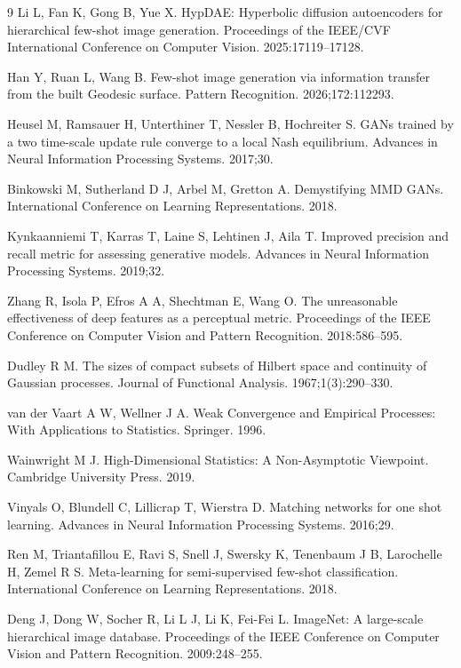\documentclass{article}
\begin{document}
\begin{thebibliography}{9}
Li L, Fan K, Gong B, Yue X. HypDAE: Hyperbolic diffusion autoencoders for hierarchical few-shot image generation. Proceedings of the IEEE/CVF International Conference on Computer Vision. 2025:17119--17128.

Han Y, Ruan L, Wang B. Few-shot image generation via information transfer from the built Geodesic surface. Pattern Recognition. 2026;172:112293.

Heusel M, Ramsauer H, Unterthiner T, Nessler B, Hochreiter S. GANs trained by a two time-scale update rule converge to a local Nash equilibrium. Advances in Neural Information Processing Systems. 2017;30.

Binkowski M, Sutherland D J, Arbel M, Gretton A. Demystifying MMD GANs. International Conference on Learning Representations. 2018.

Kynkaanniemi T, Karras T, Laine S, Lehtinen J, Aila T. Improved precision and recall metric for assessing generative models. Advances in Neural Information Processing Systems. 2019;32.

Zhang R, Isola P, Efros A A, Shechtman E, Wang O. The unreasonable effectiveness of deep features as a perceptual metric. Proceedings of the IEEE Conference on Computer Vision and Pattern Recognition. 2018:586--595.

Dudley R M. The sizes of compact subsets of Hilbert space and continuity of Gaussian processes. Journal of Functional Analysis. 1967;1(3):290--330.

van der Vaart A W, Wellner J A. Weak Convergence and Empirical Processes: With Applications to Statistics. Springer. 1996.

Wainwright M J. High-Dimensional Statistics: A Non-Asymptotic Viewpoint. Cambridge University Press. 2019.

Vinyals O, Blundell C, Lillicrap T, Wierstra D. Matching networks for one shot learning. Advances in Neural Information Processing Systems. 2016;29.

Ren M, Triantafillou E, Ravi S, Snell J, Swersky K, Tenenbaum J B, Larochelle H, Zemel R S. Meta-learning for semi-supervised few-shot classification. International Conference on Learning Representations. 2018.

Deng J, Dong W, Socher R, Li L J, Li K, Fei-Fei L. ImageNet: A large-scale hierarchical image database. Proceedings of the IEEE Conference on Computer Vision and Pattern Recognition. 2009:248--255.


\end{thebibliography}
\end{document}
